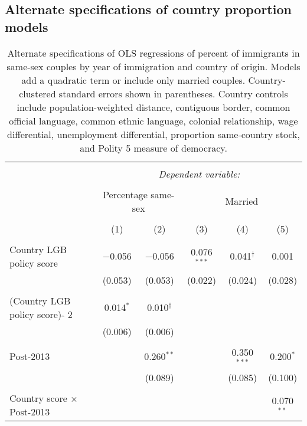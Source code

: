 \documentclass[
  11pt,
]{article}
\begin{document}
\newpage

\hypertarget{alternate-specifications-of-country-proportion-models}{%
\subsection{Alternate specifications of country proportion models}\label{alternate-specifications-of-country-proportion-models}}

\begin{table}[!htbp] \centering 
  \caption{Alternate specifications of OLS regressions of percent of immigrants in same-sex couples by year of immigration and country of origin. Models add a quadratic term or include only married couples. Country-clustered standard errors shown in parentheses. Country controls include population-weighted distance, contiguous border, common official language, common ethnic language, colonial relationship, wage differential, unemployment differential, proportion same-country stock, and Polity 5 measure of democracy.} 
  \label{tab:country-props-alt} 
\begin{tabular}{@{\extracolsep{5pt}}lccccc} 
\\[-1.8ex]\hline 
\hline \\[-1.8ex] 
 & \multicolumn{5}{c}{\textit{Dependent variable:}} \\ 
\cline{2-6} 
\\[-1.8ex] & \multicolumn{2}{c}{Percentage same-sex} & \multicolumn{3}{c}{Married} \\ 
\\[-1.8ex] & (1) & (2) & (3) & (4) & (5)\\ 
\hline \\[-1.8ex] 
 Country LGB policy score & $-$0.056 & $-$0.056 & 0.076$^{***}$ & 0.041$^{†}$ & 0.001 \\ 
  & (0.053) & (0.053) & (0.022) & (0.024) & (0.028) \\ 
  & & & & & \\ 
 (Country LGB policy score) $\hat{}$ 2 & 0.014$^{*}$ & 0.010$^{†}$ &  &  &  \\ 
  & (0.006) & (0.006) &  &  &  \\ 
  & & & & & \\ 
 Post-2013 &  & 0.260$^{**}$ &  & 0.350$^{***}$ & 0.200$^{*}$ \\ 
  &  & (0.089) &  & (0.085) & (0.100) \\ 
  & & & & & \\ 
 Country score × Post-2013 &  &  &  &  & 0.070$^{**}$ \\ 

\end{tabular}
\end{table}
\end{document}
